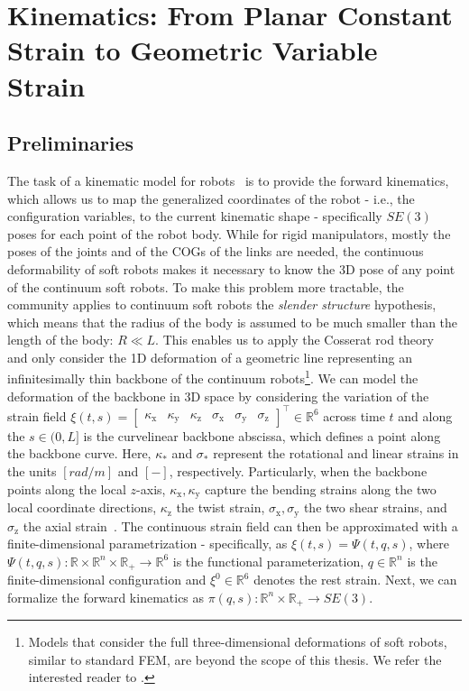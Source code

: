 \section{Kinematics: From Planar Constant Strain to Geometric Variable Strain}\label{sec:background:kinematics}

\subsection{Preliminaries}
The task of a kinematic model for robots~\citep{siciliano2010robotics} is to provide the forward kinematics, which allows us to map the generalized coordinates of the robot - i.e., the configuration variables, to the current kinematic shape - specifically $SE(3)$ poses for each point of the robot body.
While for rigid manipulators, mostly the poses of the joints and of the  \glspl{COG} of the links are needed, the continuous deformability of soft robots makes it necessary to know the 3D pose of any point of the continuum soft robots. To make this problem more tractable, the community applies to continuum soft robots the \emph{slender structure} hypothesis, which means that the radius of the body is assumed to be much smaller than the length of the body: $R \ll L$.
This enables us to apply the Cosserat rod theory~\citep{cosserat1909theorie} and only consider the 1D deformation of a geometric line representing an infinitesimally thin backbone of the continuum robots\footnote{Models that consider the full three-dimensional deformations of soft robots, similar to standard \gls{FEM}, are beyond the scope of this thesis. We refer the interested reader to \citet{faure2012sofa, coevoet2017software, armanini2023soft}.}.
We can model the deformation of the backbone in 3D space by considering the variation of the strain field $\xi(t,s) = \begin{bmatrix}
    \kappa_\mathrm{x} & \kappa_\mathrm{y} & \kappa_\mathrm{z} & \sigma_\mathrm{x} & \sigma_\mathrm{y} & \sigma_\mathrm{z} 
\end{bmatrix}^\top \in \mathbb{R}^6$ across time $t$ and along the $s \in (0,L]$ is the curvelinear backbone abscissa, which defines a point along the backbone curve.
Here, $\kappa_*$ and $\sigma_*$ represent the rotational and linear strains in the units $[\si{rad \per m}]$ and $[-]$, respectively.
Particularly, when the backbone points along the local $z$-axis, $\kappa_\mathrm{x}, \kappa_\mathrm{y}$ capture the bending strains along the two local coordinate directions, $\kappa_\mathrm{z}$ the twist strain, $\sigma_\mathrm{x}, \sigma_\mathrm{y}$ the two shear strains, and $\sigma_\mathrm{z}$ the axial strain~\citep{della2023model}.
The continuous strain field can then be approximated with a finite-dimensional parametrization - specifically, as $\xi(t,s) = \Psi(t,q,s)$, where $\Psi(t,q,s): \mathbb{R} \times \mathbb{R}^n \times \mathbb{R}_+ \to \mathbb{R}^6$ is the functional parameterization, $q \in \mathbb{R}^n$ is the finite-dimensional configuration and $\xi^0 \in \mathbb{R}^6$ denotes the rest strain. 
Next, we can formalize the forward kinematics as $\pi(q,s): \mathbb{R}^n \times \mathbb{R}_+ \to SE(3)$.

